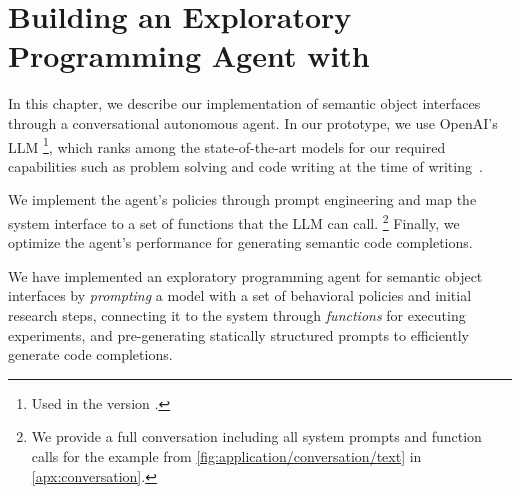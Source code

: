 
\chapter{Building an Exploratory Programming Agent with \gptfouro}
\label{cha:agent}

In this chapter, we describe our implementation of semantic object interfaces through a conversational autonomous agent.
In our prototype, we use OpenAI's LLM \gptfouro\footnote{Used in the version .}, which ranks among the state-of-the-art models for our required capabilities such as problem solving and code writing at the time of writing~\cite{openai2024gpt4}.

We implement the agent's policies through prompt engineering and map the system interface to a set of functions that the LLM can call.%
\footnote{We provide a full conversation including all system prompts and function calls for the example from \cref{fig:application/conversation/text} in \cref{apx:conversation}.} %
Finally, we optimize the agent's performance for generating semantic code completions.


\begin{summary}
	We have implemented an exploratory programming agent for semantic object interfaces by \emph{prompting} a \gptfouro model with a set of behavioral policies and initial research steps, connecting it to the system through \emph{functions} for executing experiments, and pre-generating statically structured prompts to efficiently generate code completions.
\end{summary}
